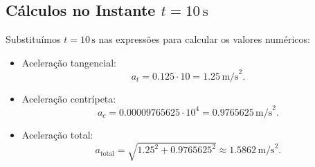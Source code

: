 \subsection*{Cálculos no Instante \(t = 10 \, \text{s}\)}
Substituímos \(t = 10 \, \text{s}\) nas expressões para calcular os valores numéricos:
\begin{itemize}
    \item Aceleração tangencial:
    \[
    a_t = 0.125 \cdot 10 = 1.25 \, \text{m/s}^2.
    \]
    \item Aceleração centrípeta:
    \[
    a_c = 0.00009765625 \cdot 10^4 = 0.9765625 \, \text{m/s}^2.
    \]
    \item Aceleração total:
    \[
    a_{\text{total}} = \sqrt{1.25^2 + 0.9765625^2} \approx 1.5862 \, \text{m/s}^2.
    \]
\end{itemize}

